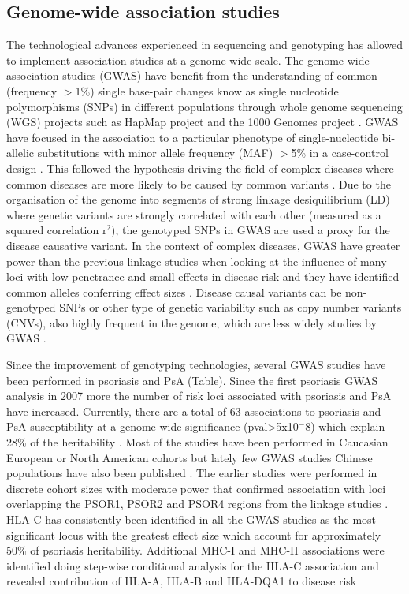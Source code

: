\subsection{Genome-wide association studies}
The technological advances experienced in sequencing and genotyping has allowed to implement association studies at a genome-wide scale. The genome-wide association studies (GWAS) have benefit from the understanding of common (frequency ${>}$1\%) single base-pair changes know as single nucleotide polymorphisms (SNPs) in different populations through whole genome sequencing (WGS) projects such as HapMap \parencite{The international HapMaP Consortium} project and the 1000 Genomes project \parencite{The 1000 Genomes}. GWAS have focused in the association to a particular phenotype of single-nucleotide bi-allelic substitutions with minor allele frequency (MAF) ${>}$5\% in a case-control design \parencite{Ku2010}. This followed the hypothesis driving the field of complex diseases where common diseases are more likely to be caused by common variants \parencite{Schork2009}. Due to the organisation of the genome into segments of strong linkage desiquilibrium (LD) where genetic variants are strongly correlated with each other (measured as a squared correlation r$^2$), the genotyped SNPs in GWAS are used a proxy for the disease causative variant. In the context of complex diseases, GWAS have greater power than the previous linkage studies when looking at the influence of many loci with low penetrance and small effects in disease risk and they have identified common alleles conferring effect sizes \parencite{Cui2010}.
Disease causal variants can be non-genotyped SNPs or other type of genetic variability such as copy number variants (CNVs), also highly frequent in the genome, which are less widely studies by GWAS \parencite{Hirschhorn2005, Ku2010}. 

Since the improvement of genotyping technologies, several GWAS studies have been performed in psoriasis and PsA (Table). Since the first psoriasis GWAS analysis in 2007 more the number of risk loci associated with psoriasis and PsA have increased. Currently, there are a total of 63 associations to psoriasis and PsA susceptibility at a genome-wide significance (pval>5x10$^-8$) which explain 28\% of the heritability \parencite{Tsoi2017}. Most of the studies have been performed in Caucasian European or North American cohorts but lately few GWAS studies Chinese populations have also been published \parencite{Zhang2009, Sun2010, Yin2015}. The earlier studies were performed in discrete cohort sizes with moderate power that confirmed association with loci overlapping the PSOR1, PSOR2 and PSOR4 regions from the linkage studies \parencite{}. HLA-C has consistently been identified in all the GWAS studies as the most significant locus with the greatest effect size which account for approximately 50\% of psoriasis heritability. Additional MHC-I and MHC-II associations were identified doing step-wise conditional analysis for the HLA-C association and revealed contribution of HLA-A, HLA-B and HLA-DQA1 to disease risk \parencite{Okada2014}   

